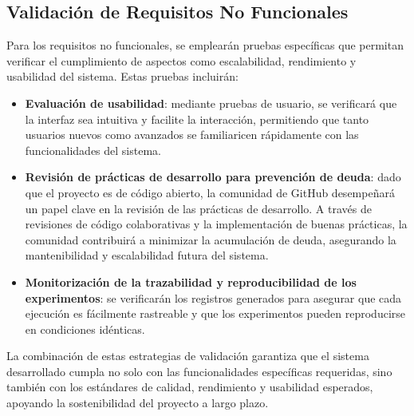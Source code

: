 \subsection{Validación de Requisitos No Funcionales} Para los requisitos no funcionales, se emplearán pruebas específicas que permitan verificar el cumplimiento de aspectos como escalabilidad, rendimiento y usabilidad del sistema. Estas pruebas incluirán:
\begin{itemize}
    \item \textbf{Evaluación de usabilidad}: mediante pruebas de usuario, se verificará que la interfaz sea intuitiva y facilite la interacción, permitiendo que tanto usuarios nuevos como avanzados se familiaricen rápidamente con las funcionalidades del sistema.
    \item \textbf{Revisión de prácticas de desarrollo para prevención de \Gls{deuda}}: dado que el proyecto es de código abierto, la comunidad de GitHub desempeñará un papel clave en la revisión de las prácticas de desarrollo. A través de revisiones de código colaborativas y la implementación de buenas prácticas, la comunidad contribuirá a minimizar la acumulación de \Gls{deuda}, asegurando la mantenibilidad y escalabilidad futura del sistema.
    \item \textbf{Monitorización de la trazabilidad y reproducibilidad de los experimentos}: se verificarán los registros generados para asegurar que cada ejecución es fácilmente rastreable y que los experimentos pueden reproducirse en condiciones idénticas.
\end{itemize}

La combinación de estas estrategias de validación garantiza que el sistema desarrollado cumpla no solo con las funcionalidades específicas requeridas, sino también con los estándares de calidad, rendimiento y usabilidad esperados, apoyando la sostenibilidad del proyecto a largo plazo.